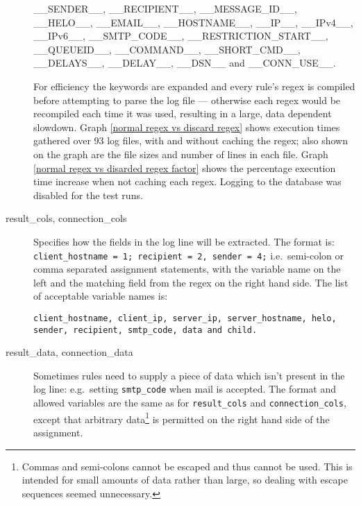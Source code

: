 \documentclass[a4paper,12pt,draft]{article}
\begin{document}
\begin{description}
        \_\_SENDER\_\_, \_\_RECIPIENT\_\_, \_\_MESSAGE\_ID\_\_,
        \_\_HELO\_\_, \newline \_\_EMAIL\_\_, \_\_HOSTNAME\_\_, \_\_IP\_\_,
        \_\_IPv4\_\_, \_\_IPv6\_\_, \newline \_\_SMTP\_CODE\_\_,
        \_\_RESTRICTION\_START\_\_, \_\_QUEUEID\_\_, \newline
        \_\_COMMAND\_\_, \_\_SHORT\_CMD\_\_, \_\_DELAYS\_\_, \_\_DELAY\_\_,
        \_\_DSN\_\_ and \_\_CONN\_USE\_\_.


        For efficiency the keywords are expanded and every rule's regex is
        compiled before attempting to parse the log file --- otherwise each
        regex would be recompiled each time it was used, resulting in a
        large, data dependent slowdown.  Graph \ref{normal regex vs discard
        regex} shows execution times gathered over 93 log files, with and
        without caching the regex; also shown on the graph are the file
        sizes and number of lines in each file.  Graph \ref{normal regex vs
        disarded regex factor} shows the percentage execution time increase
        when not caching each regex.  Logging to the database was disabled
        for the test runs.

    \item [result\_cols, connection\_cols] Specifies how the fields in the
        log line will be extracted.  The format is: \newline
        \texttt{client\_hostname = 1; recipient = 2, sender = 4;} \newline
        i.e.\ semi-colon or comma separated assignment statements, with the
        variable name on the left and the matching field from the regex on
        the right hand side.  The list of acceptable variable names is:

        \texttt{client\_hostname, client\_ip, server\_ip, server\_hostname,
        \newline helo, sender, recipient, smtp\_code, data and child.}

    \item [result\_data, connection\_data] Sometimes rules need to supply a
        piece of data which isn't present in the log line: e.g.\ setting
        \texttt{smtp\_code} when mail is accepted.  The format and allowed
        variables are the same as for \texttt{result\_cols} and
        \texttt{connection\_cols}, except that arbitrary
        data\footnote{Commas and semi-colons cannot be escaped and thus
        cannot be used.  This is intended for small amounts of data rather
        than large, so dealing with escape sequences seemed unnecessary.}
        is permitted on the right hand side of the assignment.


\end{description}
\end{document}
